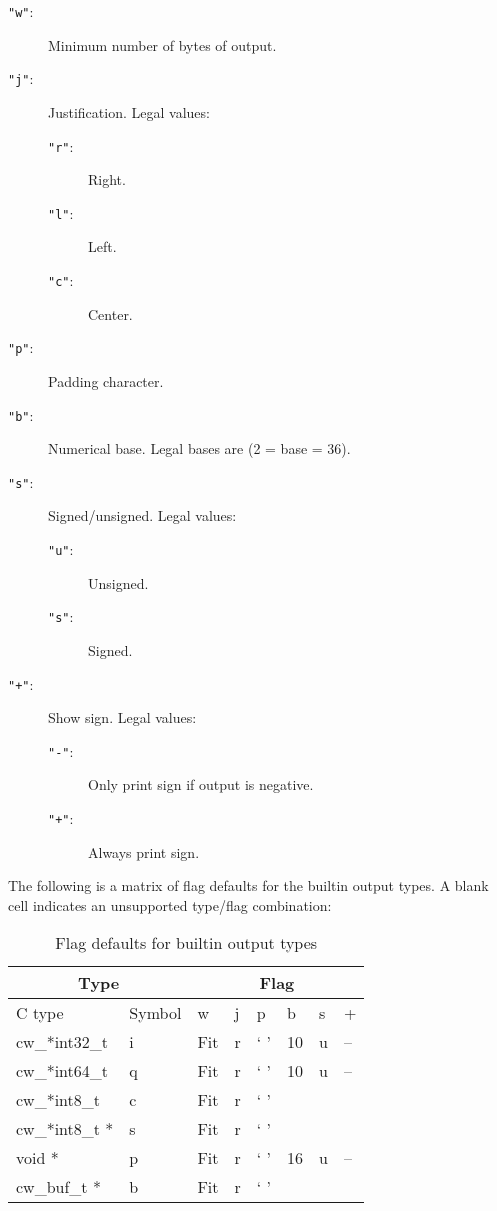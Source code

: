 \begin{description}
\item[{\tt "w"}: ]
	Minimum number of bytes of output.
\item[{\tt "j"}: ]
	Justification.  Legal values:
	\begin{description}
	\item[{\tt "r"}: ]
		Right.
	\item[{\tt "l"}: ]
		Left.
	\item[{\tt "c"}: ]
		Center.
	\end{description}
\item[{\tt "p"}: ]
	 Padding character.
\item[{\tt "b"}: ]
	Numerical base.  Legal bases are (2 {\lt}= base {\lt}= 36).
\item[{\tt "s"}: ]
	Signed/unsigned.  Legal values:
	\begin{description}
	\item[{\tt "u"}: ]
		 Unsigned.
	\item[{\tt "s"}: ]
		Signed.
	\end{description}
\item[{\tt "+"}: ]
	Show sign.  Legal values:
	\begin{description}
	\item[{\tt "-"}: ]
		Only print sign if output is negative.
	\item[{\tt "+"}: ]
		Always print sign.
	\end{description}
\end{description}

The following is a matrix of flag defaults for the builtin output types.  A
blank cell indicates an unsupported type/flag combination:
\begin{table}[htb]
\begin{center}
\begin{tabular}{|l|l||l|l|l|l|l|l|}
\hline
\multicolumn{2}{|c||}{Type} & \multicolumn{6}{c|}{Flag} \\
\hline
C type		& Symbol & w	& j	& p	& b	& s	& +	\\
\hline \hline
cw\_*int32\_t	& i	& Fit	& r	& ` '	& 10	& u	& --	\\
\hline
cw\_*int64\_t	& q	& Fit	& r	& ` '	& 10	& u	& --	\\
\hline
cw\_*int8\_t	& c	& Fit	& r	& ` '	&	&	&	\\
\hline
cw\_*int8\_t *	& s	& Fit	& r	& ` '	&	&	&	\\
\hline
void *		& p	& Fit	& r	& ` '	& 16	& u	& --	\\
\hline
cw\_buf\_t *	& b	& Fit	& r	& ` '	&	&	&	\\
\hline
\end{tabular}
\end{center}
\caption{Flag defaults for builtin output types}
\end{table}

